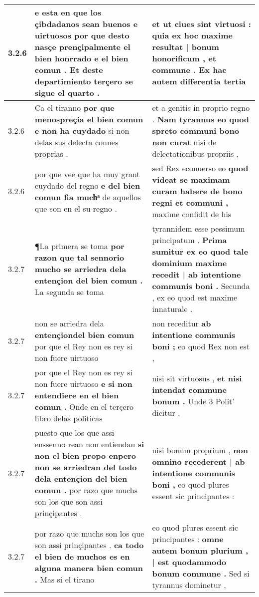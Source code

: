 \begin{tabular}{|p{1cm}|p{6.5cm}|p{6.5cm}|}
3.2.6 & e esta en que los çibdadanos sean buenos e uirtuosos \textbf{ por que desto nasçe prençipalmente el bien honrrado e el bien comun . } Et deste departimiento terçero se sigue el quarto . & et ut ciues sint virtuosi : \textbf{ quia ex hoc maxime resultat | bonum honorificum , et commune . } Ex hac autem differentia tertia \\\hline
3.2.6 & Ca el tiranno \textbf{ por que menospreçia el bien comun e non ha cuydado } si non delas sus delecta connes proprias . & et a genitis in proprio regno . \textbf{ Nam tyrannus eo quod spreto communi bono non curat } nisi de delectationibus propriis , \\\hline
3.2.6 & por que vee que ha muy grant cuydado del regno \textbf{ e del bien comun fia muchͣ } de aquellos que son en el su regno . & sed Rex econuerso eo \textbf{ quod videat se maximam curam habere de bono regni et communi , } maxime confidit de his \\\hline
3.2.7 & ¶La primera se toma \textbf{ por razon que tal sennorio mucho se arriedra dela entençion del bien comun . } La segunda se toma & tyrannidem esse pessimum principatum . \textbf{ Prima sumitur ex eo quod tale dominium maxime recedit | ab intentione communis boni . } Secunda , ex eo quod est maxime innaturale . \\\hline
3.2.7 & non se arriedra dela \textbf{ entençiondel bien comun } por que el Rey non es rey si non fuere uirtuoso & non receditur \textbf{ ab intentione communis boni ; } eo quod Rex non est , \\\hline
3.2.7 & por que el Rey non es rey si non fuere uirtuoso \textbf{ e si non entendiere en el bien comun . } Onde en el terçero libro delas politicas & nisi sit virtuosus , \textbf{ et nisi intendat commune bonum . } Unde 3 Polit’ dicitur , \\\hline
3.2.7 & puesto que los que assi enssenno rean non entiendan \textbf{ si non el bien propo enpero non se arriedran del todo dela entençion del bien comun . } por razo que muchs son los que son assi prinçipantes . & nisi bonum proprium , \textbf{ non omnino recederent | ab intentione communis boni , } eo quod plures essent sic principantes : \\\hline
3.2.7 & por razo que muchs son los que son assi prinçipantes . \textbf{ ca todo el bien de muchos es en alguna manera bien comun . } Mas si el tirano & eo quod plures essent sic principantes : \textbf{ omne autem bonum plurium , | est quodammodo bonum commune . } Sed si tyrannus dominetur , \\\hline

\end{tabular}
